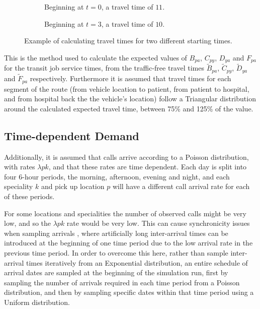 \documentclass[preprint,12pt]{elsarticle}
\begin{document}
\begin{figure}
    \begin{center}
    \begin{subfigure}{6.6cm}
    
    \caption{Beginning at $t=0$, a travel time of $11$.}
    \label{fig:travel_times_1}
    \end{subfigure}
    \begin{subfigure}{6.6cm}
    
    \caption{Beginning at $t=3$, a travel time of $10$.}
    \label{fig:travel_times_2}
    \end{subfigure}
    \end{center}
    \caption{Example of calculating travel times for two different starting
    times.}
    \label{fig:travel_times}
\end{figure}

This is the method used to calculate the expected values of $B_{pa}$,
$C_{py}$, $D_{ya}$ and $F_{pa}$ for the transit job service times, from the
traffic-free travel times $\tilde{B}_{pa}$, $\tilde{C}_{py}$, $\tilde{D}_{ya}$
and $\tilde{F}_{pa}$ respectively.
Furthermore it is assumed that travel times for each segment of the route
(from vehicle location to patient, from patient to hospital, and from hospital
back the the vehicle's location) follow a Triangular distribution around the
calculated expected travel time, between 75\% and 125\% of the value.


\subsection{Time-dependent Demand}
Additionally, it is assumed that calls arrive according to a Poisson
distribution, with rates $\lambda{pk}$, and that these rates are time
dependent. Each day is split into four 6-hour periods, the morning, afternoon,
evening and night, and each speciality $k$ and pick up location $p$ will have
a different call arrival rate for each of these periods.

For some locations and specialities the number of observed calls might be very
low, and so the $\lambda{pk}$ rate would be very low. This can cause
synchronicity issues when sampling arrivals \citep{pidd2004computer}, where
artificially long inter-arrival times can be introduced at the beginning of
one time period due to the low arrival rate in the previous time period.
In order to overcome this here, rather than sample inter-arrival times
iteratively from an Exponential distribution, an entire schedule of arrival
dates are sampled at the beginning of the simulation run, first by sampling
the number of arrivals required in each time period from a Poisson
distribution, and then by sampling specific dates within that time period
using a Uniform distribution.
\end{document}

